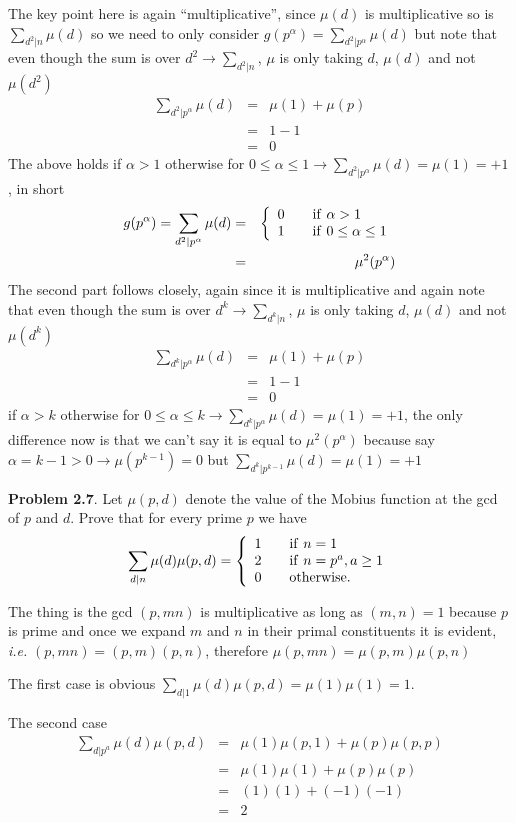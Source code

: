 \documentclass[aps,preprint,preprintnumbers,nofootinbib,showpacs,prd]{revtex4-1}
\newcommand{\ie}{{\it i.e.} }
\newcommand{\nbea}{\begin{eqnarray*}}
\newcommand{\neea}{\end{eqnarray*}}
\begin{document}
The key point here is again ``multiplicative'', since $\mu(d)$ is multiplicative so is $\sum_{d^2|n} \mu(d)$ so we need to only consider $g(p^\alpha) = \sum_{d^2|p^\alpha} \mu(d)$ but note that even though the sum is over $d^2 \to \sum_{d^2|n}$, $\mu$ is only taking $d$, $\mu(d)$ and not $\mu(d^2)$
%
\nbea
\sum_{d^2|p^\alpha} \mu(d) & = & \mu(1) + \mu(p) \\
& = & 1 - 1 \\
& = & 0
\neea
%
The above holds if $\alpha > 1$ otherwise for $0 \le \alpha \le 1 \to \sum_{d^2|p^\alpha} \mu(d) = \mu(1) = +1$, in short
%
\nbea
g(p^\alpha) = \sum_{d^2|p^\alpha} \mu(d) & = & \left \{
\begin{array}{r c  l}
0 && {\rm if ~} \alpha > 1 \\
1 && {\rm if ~} 0 \le \alpha \le 1 \\
\end{array}\right. \\
& = & \mu^2(p^\alpha)
\neea
%
The second part follows closely, again since it is multiplicative and again note that even though the sum is over $d^k \to \sum_{d^k|n}$, $\mu$ is only taking $d$, $\mu(d)$ and not $\mu(d^k)$
%
\nbea
\sum_{d^k|p^\alpha} \mu(d) & = & \mu(1) + \mu(p) \\
& = & 1 - 1 \\
& = & 0
\neea
%
if $\alpha > k$ otherwise for $0 \le \alpha \le k \to \sum_{d^k|p^\alpha} \mu(d) = \mu(1) = +1$, the only difference now is that we can't say it is equal to $\mu^2(p^\alpha)$ because say $\alpha = k-1 > 0 \to \mu(p^{k-1}) = 0$ but $\sum_{d^k|p^{k-1}} \mu(d) = \mu(1) = +1$

{\bf Problem 2.7}. Let $\mu(p,d)$ denote the value of the Mobius function at the gcd of $p$ and $d$. Prove that for every prime $p$ we have
%
\nbea
\sum_{d|n} \mu(d)\mu(p,d) = \left \{
\begin{array}{l c l}
1 && {\rm if~} n = 1 \\
2 && {\rm if~} n = p^a, a \ge 1 \\
0 && {\rm otherwise}.
\end{array}\right.
\neea
%

The thing is the gcd $(p,mn)$ is multiplicative as long as $(m,n)=1$ because $p$ is prime and once we expand $m$ and $n$ in their primal constituents it is evident, \ie $(p,mn) = (p,m)(p,n)$, therefore $\mu(p,mn) = \mu(p,m)\mu(p,n)$

The first case is obvious $\sum_{d|1} \mu(d)\mu(p,d) = \mu(1)\mu(1) = 1$.

The second case
%
\nbea
\sum_{d|p^a} \mu(d)\mu(p,d) & = & \mu(1)\mu(p,1) + \mu(p)\mu(p,p) \\
& = & \mu(1)\mu(1) + \mu(p)\mu(p) \\
& = & (1)(1) + (-1)(-1) \\
& = & 2
\neea
%
\end{document}
